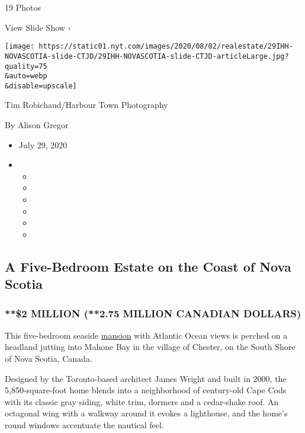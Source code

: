 19 Photos

View Slide Show ›

\texttt{[image: https://static01.nyt.com/images/2020/08/02/realestate/29IHH-NOVASCOTIA-slide-CTJD/29IHH-NOVASCOTIA-slide-CTJD-articleLarge.jpg?quality=75\\\&auto=webp\\\&disable=upscale]}

Tim Robichaud/Harbour Town Photography

By Alison Gregor

\begin{itemize}
\item
  July 29, 2020
\item
  \begin{itemize}
  \item
  \item
  \item
  \item
  \item
  \item
  \end{itemize}
\end{itemize}

\hypertarget{a-five-bedroom-estate-on-the-coast-of-nova-scotia}{%
\subsection{A Five-Bedroom Estate on the Coast of Nova
Scotia}\label{a-five-bedroom-estate-on-the-coast-of-nova-scotia}}

\hypertarget{2-million-275-million-canadian-dollars}{%
\subsubsection{**\$2 MILLION (**2.75 MILLION CANADIAN
DOLLARS)}\label{2-million-275-million-canadian-dollars}}

This five-bedroom seaside
\href{https://novascotia.evrealestate.com/ListingDetails/26-Fredas-Point-Extension-Chester-NS-B0J-1J0/201909280}{mansion}
with Atlantic Ocean views is perched on a headland jutting into Mahone
Bay in the village of Chester, on the South Shore of Nova Scotia,
Canada.

Designed by the Toronto-based architect James Wright and built in 2000,
the 5,850-square-foot home blends into a neighborhood of century-old
Cape Cods with its classic gray siding, white trim, dormers and a
cedar-shake roof. An octagonal wing with a walkway around it evokes a
lighthouse, and the home's round windows accentuate the nautical feel.

